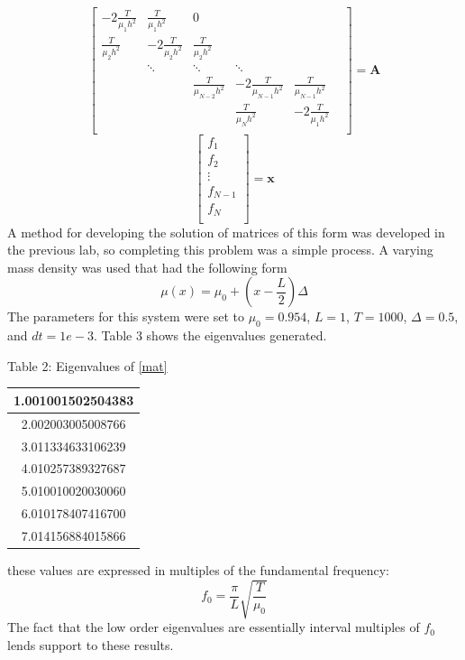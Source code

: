 \documentclass[12pt]{article}
\begin{document}
\[
\begin{bmatrix}
-2\frac{T}{\mu_1 h^2} & \frac{T}{\mu_1h^2} &0 & & \\
\frac{T}{\mu_2 h^2} & -2\frac{T}{\mu_2 h^2} & \frac{T}{\mu_2 h^2}& & \\
 & \ddots&\ddots & \ddots & & \\
 & & \frac{T}{\mu_{N-2} h^2} & -2\frac{T}{\mu_{N-1} h^2}& \frac{T}{\mu_{N-1} h^2} \\
 & & & \frac{T}{\mu_N h^2} & -2\frac{T}{\mu_1 h^2} \\  
\end{bmatrix}
  =
\mathbf{A} \]
\[
\begin{bmatrix}
f_1\\
f_2\\
\vdots \\
f_{N-1}\\
f_N\\
\end{bmatrix}
  =
\mathbf{x} \]
A method for developing the solution of matrices of this form was developed in the previous lab, so completing this problem was a simple process.  A varying mass density was used that had the following form
\begin{equation}
\label{mu}
\mu(x)= \mu_0 + (x - \frac{L}{2})\Delta
\end{equation}
The parameters for this system were set to $\mu_0 = 0.954$, $L=1$, $T=1000$, $\Delta=0.5$, and $dt=1e-3$.  Table 3 shows the eigenvalues generated.
\begin{center}
Table 2:  Eigenvalues of \eqref{mat} \\
\begin{tabular}{ | c |}
\hline
1.001001502504383 \\ \hline
2.002003005008766 \\ \hline
3.011334633106239 \\ \hline
4.010257389327687 \\ \hline
5.010010020030060 \\ \hline
6.010178407416700 \\ \hline
7.014156884015866 \\ \hline
\end{tabular}
\end{center}
these values are expressed in multiples of the fundamental frequency:
\begin{equation}
\label{f0}
f_0=\frac{\pi}{L}\sqrt{\frac{T}{\mu_0}}
\end{equation}
The fact that the low order eigenvalues are essentially interval multiples of $f_0$ lends support to these results.
\end{document}
